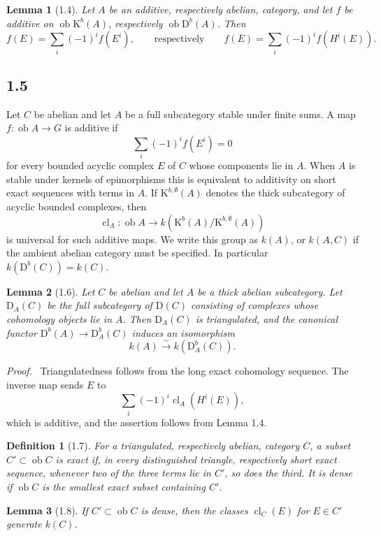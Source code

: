 \documentclass[13pt]{extarticle}
\newcommand{\D}{\mathrm D}
\newcommand{\K}{\mathrm K}
\newcommand{\ob}{\operatorname{ob}}
\newcommand{\cl}{\operatorname{cl}}
\newcommand{\iso}{\xrightarrow{\sim}}
\newenvironment{prooftext}[1][Proof]{\par\noindent\emph{#1.}\ }{\par\medskip}
\newtheorem*{lemma*}{Lemma}
\newtheorem*{definition*}{Definition}
\begin{document}
\begin{lemma*}[1.4]
Let $A$ be an additive, respectively abelian, category, and let $f$ be additive on $\ob\K^b(A)$, respectively $\ob\D^b(A)$. Then
\[
f(E)=\sum_i(-1)^if(E^i),
\qquad
\text{respectively}\qquad
f(E)=\sum_i(-1)^if(H^i(E)).
\]
\end{lemma*}

\subsection*{1.5}
Let $C$ be abelian and let $A$ be a full subcategory stable under finite sums. A map $f:\ob A\to G$ is additive if
\[
\sum_i(-1)^if(E^i)=0
\]
for every bounded acyclic complex $E$ of $C$ whose components lie in $A$. When $A$ is stable under kernels of epimorphisms this is equivalent to additivity on short exact sequences with terms in $A$. If $\K^{b,\emptyset}(A)$ denotes the thick subcategory of acyclic bounded complexes, then
\[
\cl_A:\ob A\to k(\K^b(A)/\K^{b,\emptyset}(A))
\]
is universal for such additive maps. We write this group as $k(A)$, or $k(A,C)$ if the ambient abelian category must be specified. In particular $k(\D^b(C))=k(C)$.

\begin{lemma*}[1.6]
Let $C$ be abelian and let $A$ be a thick abelian subcategory. Let $\D_A(C)$ be the full subcategory of $\D(C)$ consisting of complexes whose cohomology objects lie in $A$. Then $\D_A(C)$ is triangulated, and the canonical functor $\D^b(A)\to\D_A^b(C)$ induces an isomorphism
\[
k(A)\iso k(\D_A^b(C)).
\]
\end{lemma*}

\begin{prooftext}
Triangulatedness follows from the long exact cohomology sequence. The inverse map sends $E$ to
\[
\sum_i(-1)^i\cl_A(H^i(E)),
\]
which is additive, and the assertion follows from Lemma 1.4.
\end{prooftext}

\begin{definition*}[1.7]
For a triangulated, respectively abelian, category $C$, a subset $C'\subset\ob C$ is exact if, in every distinguished triangle, respectively short exact sequence, whenever two of the three terms lie in $C'$, so does the third. It is dense if $\ob C$ is the smallest exact subset containing $C'$.
\end{definition*}

\begin{lemma*}[1.8]
If $C'\subset\ob C$ is dense, then the classes $\cl_C(E)$ for $E\in C'$ generate $k(C)$.
\end{lemma*}
\end{document}
